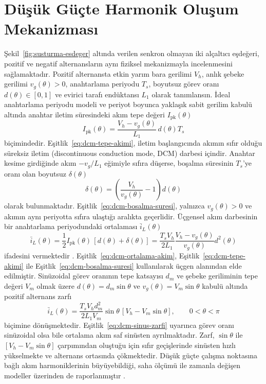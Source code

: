 \section{Düşük Güçte Harmonik Oluşum Mekanizması}
\label{sec:harmonik-mekanizma}

Şekil~\ref{fig:susturma-esdeger} altında verilen senkron olmayan iki alçaltıcı eşdeğeri, pozitif ve negatif alternansların aynı fiziksel mekanizmayla incelenmesini sağlamaktadır. Pozitif alternansta etkin yarım bara gerilimi $V_h$, anlık şebeke gerilimi $v_g(\theta)>0$, anahtarlama periyodu $T_s$, boyutsuz görev oranı $d(\theta)\in[0,1]$ ve evirici tarafı endüktansı $L_1$ olarak tanımlansın. İdeal anahtarlama periyodu modeli ve periyot boyunca yaklaşık sabit gerilim kabulü altında anahtar iletim süresindeki akım tepe değeri $I_{\mathrm{pk}}(\theta)$
\begin{equation}
  I_{\mathrm{pk}}(\theta)=\frac{V_h-v_g(\theta)}{L_1}\,d(\theta)T_s
  \label{eq:dcm-tepe-akimi}
\end{equation}
biçimindedir. Eşitlik~\eqref{eq:dcm-tepe-akimi}, iletim başlangıcında akımın sıfır olduğu süreksiz iletim (discontinuous conduction mode, DCM) darbesi içindir. Anahtar kesime girdiğinde akım $-v_g/L_1$ eğimiyle sıfıra düşerse, boşalma süresinin $T_s$'ye oranı olan boyutsuz $\delta(\theta)$
\begin{equation}
  \delta(\theta)=\left(\frac{V_h}{v_g(\theta)}-1\right)d(\theta)
  \label{eq:dcm-bosalma-suresi}
\end{equation}
olarak bulunmaktadır. Eşitlik~\eqref{eq:dcm-bosalma-suresi}, yalnızca $v_g(\theta)>0$ ve akımın aynı periyotta sıfıra ulaştığı aralıkta geçerlidir. Üçgensel akım darbesinin bir anahtarlama periyodundaki ortalaması $\bar i_L(\theta)$
\begin{equation}
  \bar i_L(\theta)=\frac{1}{2}I_{\mathrm{pk}}(\theta)\,[d(\theta)+\delta(\theta)]
  =\frac{T_sV_h}{2L_1}\frac{V_h-v_g(\theta)}{v_g(\theta)}d^2(\theta)
  \label{eq:dcm-ortalama-akim}
\end{equation}
ifadesini vermektedir \citep{Erickson2001,Chen2010}. Eşitlik~\eqref{eq:dcm-ortalama-akim}, Eşitlik~\eqref{eq:dcm-tepe-akimi} ile Eşitlik~\eqref{eq:dcm-bosalma-suresi} kullanılarak üçgen alanından elde edilmiştir. Sinüzoidal görev oranının tepe katsayısı $d_m$ ve şebeke geriliminin tepe değeri $V_m$ olmak üzere $d(\theta)=d_m\sin\theta$ ve $v_g(\theta)=V_m\sin\theta$ kabulü altında pozitif alternans zarfı
\begin{equation}
  \bar i_L(\theta)=\frac{T_sV_hd_m^2}{2L_1V_m}\sin\theta\,[V_h-V_m\sin\theta],
  \qquad 0<\theta<\pi
  \label{eq:dcm-sinus-zarfi}
\end{equation}
biçimine dönüşmektedir. Eşitlik~\eqref{eq:dcm-sinus-zarfi} uyarınca görev oranı sinüzoidal olsa bile ortalama akım saf sinüsten ayrılmaktadır. Zarf, $\sin\theta$ ile $[V_h-V_m\sin\theta]$ çarpımından oluştuğu için sıfır geçişlerinde sinüsten hızlı yükselmekte ve alternans ortasında çökmektedir. Düşük güçte çalışma noktasına bağlı akım harmoniklerinin büyüyebildiği, saha ölçümü ile zamanla değişen modeller üzerinden de raporlanmıştır \citep{Chicco2009,Du2013}.

